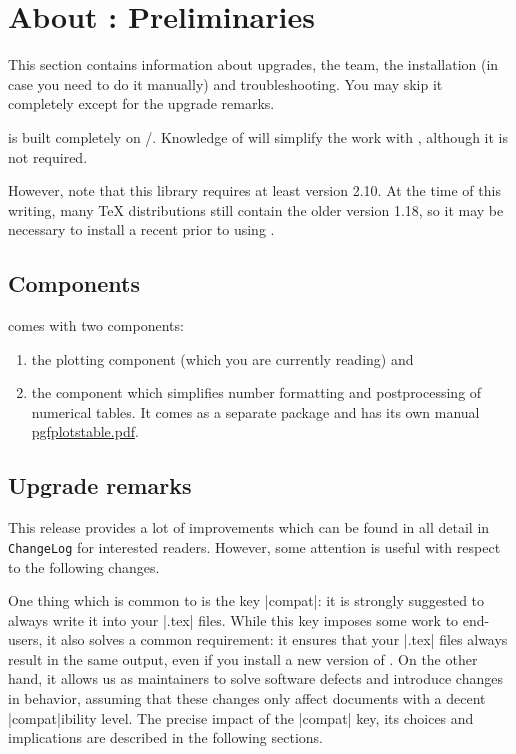 
\chapter[About PGFPlots: Preliminaries]{About {\normalfont\PGFPlots{}}: Preliminaries}

This section contains information about upgrades, the team, the installation
(in case you need to do it manually) and troubleshooting. You may skip it
completely except for the upgrade remarks.

\PGFPlots{} is built completely on \Tikz{}/\PGF{}. Knowledge of \Tikz{} will
simplify the work with \PGFPlots{}, although it is not required.

However, note that this library requires at least \PGF{} version 2.10. At the
time of this writing, many \TeX{} distributions still contain the older \PGF{}
version 1.18, so it may be necessary to install a recent \PGF{} prior to using
\PGFPlots{}.


\section{Components}

\PGFPlots{} comes with two components:
%
\begin{enumerate}
    \item the plotting component (which you are currently reading) and
    \item the \PGFPlotstable{} component which simplifies number formatting
        and postprocessing of numerical tables. It comes as a separate
        package and has its own manual
        \href{file:pgfplotstable.pdf}{pgfplotstable.pdf}.
\end{enumerate}


\section{Upgrade remarks}

This release provides a lot of improvements which can be found in all detail in
\texttt{ChangeLog} for interested readers. However, some attention is useful
with respect to the following changes.

One thing which is common to \PGFPlots{} is the key |compat|: it is strongly
suggested to always write it into your |.tex| files. While this key imposes
some work to end-users, it also solves a common requirement: it ensures that
your |.tex| files always result in the same output, even if you install a new
version of \PGFPlots{}. On the other hand, it allows us as maintainers to solve
software defects and introduce changes in behavior, assuming that these changes
only affect documents with a decent |compat|ibility level. The precise impact
of the |compat| key, its choices and implications are described in the
following sections.


